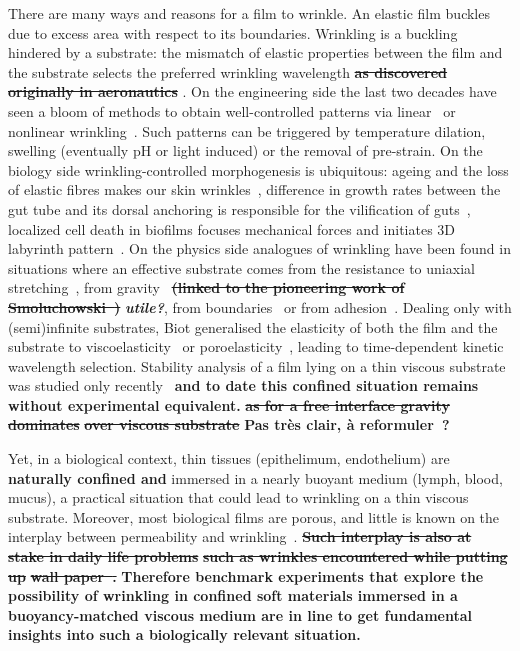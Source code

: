 \documentclass[twocolumn,superscriptaddress,showpacs,preprintnumbers,
amsmath,amssymb,prl]{revtex4-1}
\newcommand{\seb}[1]{\textbf{\color{blue}#1}} %
\newcommand{\sseb}[1]{\sout{\textbf{\color{blue}#1}}} %
\begin{document}
There are many ways and reasons for a film to wrinkle. An elastic film buckles due to excess area with respect to its boundaries. Wrinkling is a buckling hindered by a substrate: the mismatch of elastic properties between the film and the substrate selects the preferred wrinkling wavelength \sseb{as discovered originally in aeronautics} \cite{Gough1940, Bijlaard1946}. On the engineering side the last two decades have seen a bloom of methods to obtain well-controlled patterns via linear~\cite{Bowden1998, Genzer2006, Hu1998, Kim2010, Vandeparre2011, Li2013} or nonlinear wrinkling~\cite{Efimenko2005, Guvendiren2010, Kim2011a, Brau2011}. Such patterns can be triggered by temperature dilation, swelling (eventually pH or light induced) or the removal of pre-strain. On the biology side wrinkling-controlled morphogenesis is ubiquitous: ageing and the loss of elastic fibres makes our skin wrinkles~\cite{Bissett1987, Genzer2006}, difference in growth rates between the gut tube and its dorsal anchoring is responsible for the vilification of guts~\cite{Savin2011, Ciarletta2014, Shyer2013}, localized cell death in biofilms focuses mechanical forces and initiates 3D labyrinth pattern~\cite{Trejo2013, Asally2012}. On the physics side analogues of wrinkling have been found in situations where an effective substrate comes from the resistance to uniaxial stretching~\cite{Cerda2003}, from gravity~\cite{Kolinski2009, Vella2009, Pineirua2013, Lucantonio2013} \sseb{(linked to the pioneering work of Smoluchowski~\cite{Smoluchowski1927})} \seb{\it utile?}, from boundaries~\cite{Vandeparre2011a, Li2013} or from adhesion~\cite{Vella2009a}. Dealing only with (semi)infinite substrates, Biot generalised the elasticity of both the film and the substrate to viscoelasticity~\cite{Biot1957} or poroelasticity~\cite{Biot1964}, leading to time-dependent kinetic wavelength selection. Stability analysis of a film lying on a thin viscous substrate was studied only recently~\cite{Huang2002} \seb{and to date this confined situation remains without experimental equivalent.} \sseb{as for a free interface gravity dominates}
\sseb{ over viscous substrate} \seb{Pas tr\`es clair, \`a reformuler~?}

Yet, in a biological context, thin tissues (epithelimum, endothelium) are \seb{naturally confined and }immersed in a nearly buoyant medium (lymph, blood, mucus), a practical situation that could lead to wrinkling on a thin viscous substrate. Moreover, most biological films are porous, and little is known on the interplay between permeability and wrinkling~\cite{Ma2004,Longley2013}. \sseb{Such interplay is also at stake in daily life problems} 
\sseb{such as wrinkles encountered while putting up}
\sseb{ wall paper~\cite{Pacione1991}.} \seb{Therefore benchmark experiments that explore the possibility of wrinkling in confined soft materials immersed in a buoyancy-matched viscous medium are in line to get fundamental insights into such a biologically relevant situation.}
\end{document}
